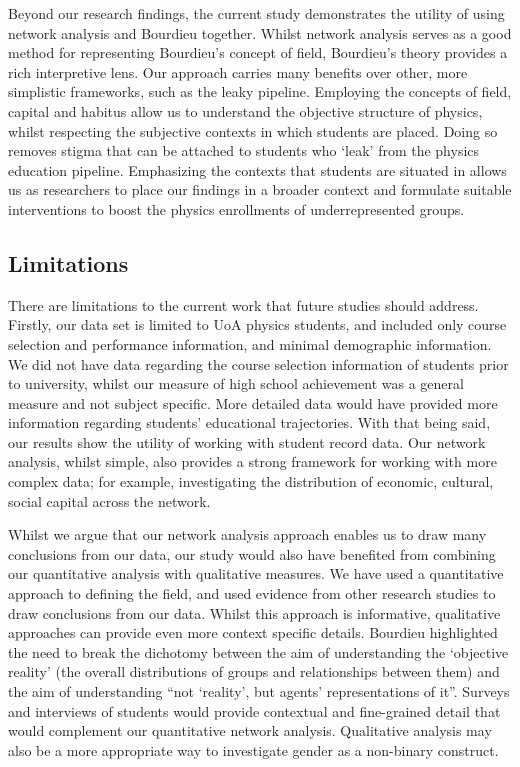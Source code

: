 Beyond our research findings, the current study demonstrates the utility of using network analysis and Bourdieu together. Whilst network analysis serves as a good method for representing Bourdieu's concept of field, Bourdieu's theory provides a rich interpretive lens. Our approach carries many benefits over other, more simplistic frameworks, such as the leaky pipeline. Employing the concepts of field, capital and habitus allow us to understand the objective structure of physics, whilst respecting the subjective contexts in which students are placed. Doing so removes stigma that can be attached to students who `leak' from the physics education pipeline. Emphasizing the contexts that students are situated in allows us as researchers to place our findings in a broader context and formulate suitable interventions to boost the physics enrollments of underrepresented groups. 

\subsection{Limitations}
There are limitations to the current work that future studies should address. Firstly, our data set is limited to UoA physics students, and included only course selection and performance information, and minimal demographic information. We did not have data regarding the course selection information of students prior to university, whilst our measure of high school achievement was a general measure and not subject specific. More detailed data would have provided more information regarding students' educational trajectories. With that being said, our results show the utility of working with student record data. Our network analysis, whilst simple, also provides a strong framework for working with more complex data; for example, investigating the distribution of economic, cultural, social capital across the network.

Whilst we argue that our network analysis approach enables us to draw many conclusions from our data, our study would also have benefited from combining our quantitative analysis with qualitative measures. We have used a quantitative approach to defining the field, and used evidence from other research studies to draw conclusions from our data. Whilst this approach is informative, qualitative approaches can provide even more context specific details. Bourdieu highlighted the need to break the dichotomy between the aim of understanding the `objective reality' (the overall distributions of groups and relationships between them) and the aim of understanding ``not `reality', but agents' representations of it''.\cite{Bourdieu_1986} Surveys and interviews of students would provide contextual and fine-grained detail that would complement our quantitative network analysis. Qualitative analysis may also be a more appropriate way to investigate gender as a non-binary construct.  

